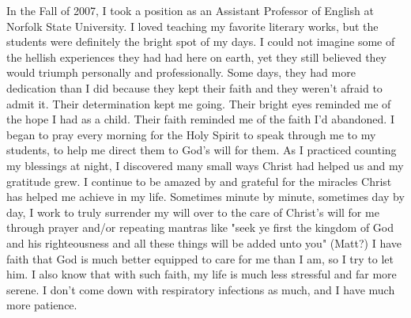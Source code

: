 \documentclass{article}%
\begin{document}
In the Fall of 2007, I took a position as an Assistant Professor of English  at Norfolk State University. 
I loved teaching my favorite literary works, but the students were definitely the bright spot of my days. I could not imagine some of the hellish experiences they had had here on earth, yet they still believed they would triumph personally and professionally. Some days, they had more dedication than I did because they kept their faith and they weren't afraid to admit it. 
Their determination kept me going. Their bright eyes reminded me of the hope I had as a child. Their faith reminded me of the faith I'd abandoned. I began to pray every morning for the Holy Spirit to speak through me to my students, to help me direct them to God's will for them. As I practiced counting my blessings at night, I discovered many small ways Christ had helped us and my gratitude grew. %
I continue to be amazed by and grateful for the miracles Christ has helped me achieve in my life. Sometimes minute by minute, sometimes day by day, I work to truly surrender my will over to the care of Christ's will for me through prayer and/or repeating mantras like "seek ye first the kingdom of God and his righteousness and all these things will be added unto you" (Matt?) I have faith that God is much better equipped to care for me than I am, so I try to let him. I also know that with such faith, my life is much less stressful and far more serene. I don't come down with respiratory infections as much, and I have much more patience.   
\end{document}
